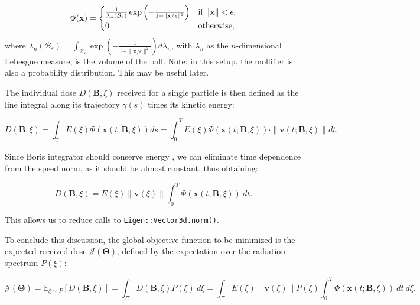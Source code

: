 \documentclass{article}
\begin{document}
	\begin{equation}
		\Phi(\mathbf{x}) = 
		\begin{cases} 
			{1 \over \lambda_n(\mathcal{B}_\varepsilon)} \exp\left(-\frac{1}{1 - \|\mathbf{x}/\epsilon\|^2}\right) & \text{if } \|\mathbf{x}\| < \epsilon, \\
			0 & \text{otherwise};
		\end{cases}
	\end{equation}
	where $\lambda_n(\mathcal{B}_\varepsilon) = \int_{\mathcal{B}_\varepsilon}  \exp\left(-\frac{1}{1 - \|\mathbf{x}/\epsilon\|^2}\right) d\lambda_n$, with $\lambda_n$ as the $n$-dimensional Lebesgue measure, is the volume of the ball. Note: in this setup, the mollifier is also a probability distribution. This may be useful later.
	
	The individual dose $D(\mathbf{B}, \xi)$ received for a single particle is then defined as the line integral along its trajectory $\gamma(s)$ times its kinetic energy:
	
	\begin{equation}
		D(\mathbf{B}, \xi) = \int_\gamma E(\xi) \Phi(\mathbf{x}(t; \mathbf{B}, \xi)) ds = \int_0^T E(\xi) \Phi(\mathbf{x}(t; \mathbf{B}, \xi)) \cdot \|\mathbf{v}(t; \mathbf{B}, \xi)\| dt.
	\end{equation}
	
	Since Boris integrator should conserve energy \cite{borisalgorithm}, we can eliminate time dependence from the speed norm, as it should be almost constant, thus obtaining:
	
	\begin{equation}
		D(\mathbf{B}, \xi) = E(\xi) \|\mathbf{v}(\xi)\| \int_0^T \Phi(\mathbf{x}(t; \mathbf{B}, \xi)) \ dt.
	\end{equation}
	
	This allows us to reduce calls to \verb|Eigen::Vector3d.norm()|. 
	
	To conclude this discussion, the global objective function to be minimized is the expected received dose $\mathcal{J}(\mathbf{\Theta})$, defined by the expectation over the radiation spectrum $P(\xi)$:
	
	\begin{equation}
		\mathcal{J}(\mathbf{\Theta}) = \mathbb{E}_{\xi \sim P} [D(\mathbf{B}, \xi)] = \int_{\Xi} D(\mathbf{B}, \xi) P(\xi) \ d\xi = \int_{\Xi} E(\xi) \|\mathbf{v}(\xi)\|  P(\xi) \int_0^T \Phi(\mathbf{x}(t; \mathbf{B}, \xi)) \ dt \ d\xi.
	\end{equation}
	
\end{document}

